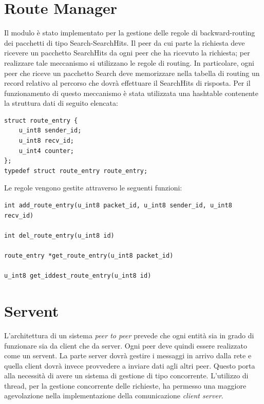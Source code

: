 \section{Route Manager}
Il modulo è stato implementato per la gestione delle regole di backward-routing dei pacchetti di tipo Search-SearchHits. Il peer da cui parte la richiesta deve ricevere un pacchetto SearchHits da ogni peer che ha ricevuto la richiesta; per realizzare tale meccanismo si utilizzano le regole di routing. In particolare, ogni peer che riceve un pacchetto Search deve memorizzare nella tabella di routing un record relativo al percorso che dovrà effettuare il SearchHits di risposta.
Per il funzionamento di questo meccanismo è stata utilizzata una hashtable contenente la struttura dati di seguito elencata:
\begin{lstlisting}[frame=trBL]
struct route_entry {
	u_int8 sender_id;
	u_int8 recv_id;
	u_int4 counter;
};
typedef struct route_entry route_entry;
\end{lstlisting}
Le regole vengono gestite attraverso le seguenti funzioni:
\begin{lstlisting}[frame=trBL]
int add_route_entry(u_int8 packet_id, u_int8 sender_id, u_int8 recv_id)

int del_route_entry(u_int8 id)

route_entry *get_route_entry(u_int8 packet_id)

u_int8 get_iddest_route_entry(u_int8 id)
\end{lstlisting}
\section{Servent}
L’architettura di un sistema \textit{peer to peer} prevede che ogni entità sia in grado di funzionare sia da client che da server. Ogni peer deve quindi essere realizzato come un servent. La parte server dovrà gestire i messaggi in arrivo dalla rete e quella client dovrà invece provvedere a inviare dati agli altri peer. Questo porta alla necessità di avere un sistema di gestione di tipo concorrente. L'utilizzo di thread, per la gestione concorrente delle richieste, ha permesso una maggiore agevolazione nella implementazione della comunicazione \textit{client server}.
